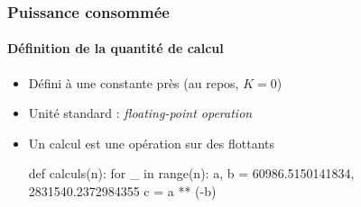 \documentclass[a4paper,11pt]{beamer}
\begin{document}
\begin{frame}[fragile]
    \frametitle{Puissance consommée}
    \framesubtitle{Définition de la quantité de calcul}

    \begin{itemize}
        \item Défini à une constante près (au repos, $K = 0$)
        \item Unité standard : \textit{floating-point operation}
        \item Un calcul est une opération sur des flottants
        \begin{python}
def calculs(n):
    for _ in range(n):
        a, b = 60986.5150141834, 2831540.2372984355
        c = a ** (-b)
        \end{python}
    \end{itemize}
\end{frame}
\end{document}
